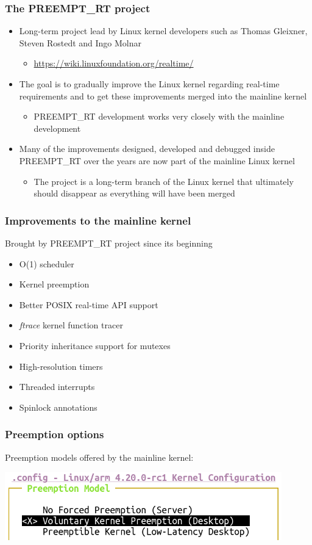 \begin{frame}
  \frametitle{The PREEMPT\_RT project}
  \begin{itemize}
  \item Long-term project lead by Linux kernel developers
    such as Thomas Gleixner, Steven Rostedt and Ingo Molnar
    \begin{itemize}
    \item \url{https://wiki.linuxfoundation.org/realtime/}
    \end{itemize}
  \item The goal is to gradually improve the Linux kernel regarding
    real-time requirements and to get these improvements merged into
    the mainline kernel
    \begin{itemize}
    \item PREEMPT\_RT development works very closely with the mainline
      development
    \end{itemize}
  \item Many of the improvements designed, developed and debugged
    inside PREEMPT\_RT over the years are now part of the mainline
    Linux kernel
    \begin{itemize}
    \item The project is a long-term branch of the Linux kernel that
      ultimately should disappear as everything will have been merged
    \end{itemize}
  \end{itemize}
\end{frame}

\begin{frame}
  \frametitle{Improvements to the mainline kernel}
  Brought by PREEMPT\_RT project since its beginning
  \begin{itemize}
  \item O(1) scheduler
  \item Kernel preemption
  \item Better POSIX real-time API support
  \item {\em ftrace} kernel function tracer
  \item Priority inheritance support for mutexes
  \item High-resolution timers
  \item Threaded interrupts
  \item Spinlock annotations
  \end{itemize}
\end{frame}

\begin{frame}
  \frametitle{Preemption options}
  Preemption models offered by the mainline kernel:
  \begin{center}
    \includegraphics[width=0.9\textwidth]{slides/sysdev-realtime/mainline-preempt-options.png}
  \end{center}
\end{frame}


